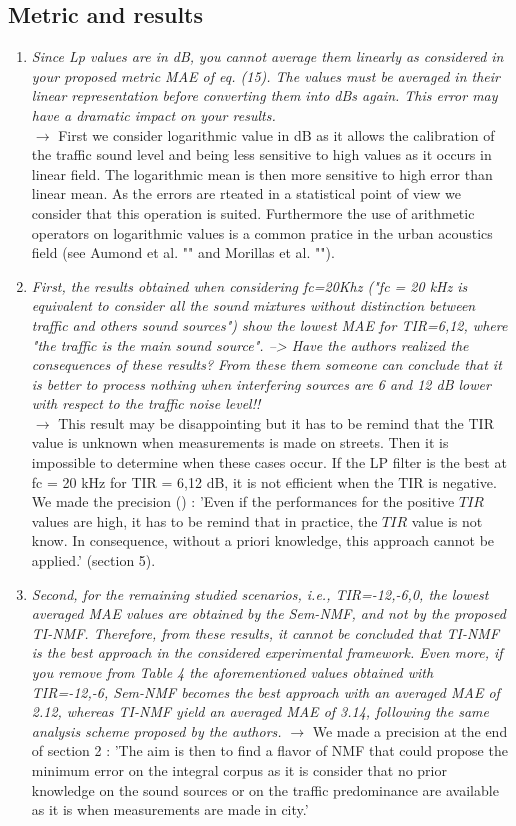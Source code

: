 \documentclass[10pt]{article}
\begin{document}
\subsection{Metric and results}

\begin{enumerate}
\item \emph{Since Lp values are in dB, you cannot average them linearly as considered in your proposed metric MAE of eq. (15). The values must be averaged in their linear representation before converting them into dBs again. This error may have a dramatic impact on your results.}\\
$\rightarrow$ First we consider logarithmic value in dB as it allows the calibration of the traffic sound level and being less sensitive to high values as it occurs in linear field. 
The logarithmic mean is then more sensitive to high error than linear mean. As the errors are rteated in a statistical point of view we consider that this operation is suited.
Furthermore the use of arithmetic operators on logarithmic values is a common pratice in the urban acoustics field (see Aumond et al. "" and Morillas et al. "").

\item \emph{First, the results obtained when considering fc=20Khz ("fc = 20 kHz is equivalent to consider all the sound mixtures without distinction between traffic and others sound sources") show the lowest MAE for TIR={6,12}, where "the traffic is the main sound source". 
--> Have the authors realized the consequences of these results? From these them someone can conclude that it is better to process nothing when interfering sources are 6 and 12 dB lower with respect to the traffic noise level!!}\\
$\rightarrow$ This result may be disappointing but it has to be remind that the TIR value is unknown when measurements is made on streets. Then it is impossible to determine when these cases occur. If the LP filter is the best at fc = 20 kHz for TIR = {6,12} dB, it is not efficient when the TIR is negative. We made the precision () : 
'Even if the performances for the positive $TIR$ values are high, it has to be remind that in practice, the $TIR$ value is not know. In consequence, without a priori knowledge, this approach cannot be applied.' (section 5).

\item \emph{Second, for the remaining studied scenarios, i.e., TIR={-12,-6,0}, the lowest averaged MAE values are obtained by the Sem-NMF, and not by the proposed TI-NMF.
Therefore, from these results, it cannot be concluded that TI-NMF is the best approach in the considered experimental framework. Even more, if you remove from Table 4 the aforementioned values obtained with TIR={-12,-6}, Sem-NMF becomes the best approach with an averaged MAE of 2.12, whereas TI-NMF yield an averaged MAE of 3.14, following the same analysis scheme proposed by the authors.}
$\rightarrow$ We made a precision at the end of section 2 : 'The aim is then to find a flavor of NMF that could propose the minimum error on the integral corpus as it is consider that no prior knowledge on the sound sources or on the traffic predominance are available as it is when measurements are made in city.'


\end{enumerate}
\end{document}

